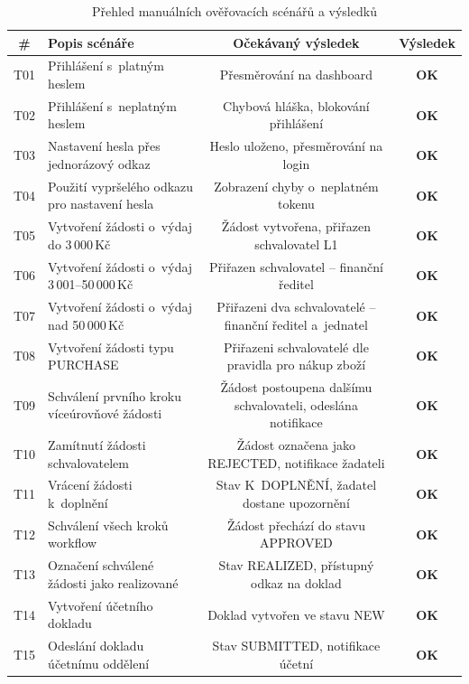 \begin{table}[H]
\centering
\caption{Přehled manuálních ověřovacích scénářů a výsledků}
\label{tab:testy}
\renewcommand{\arraystretch}{1.3}
\begin{tabularx}{\textwidth}{|c|X|c|c|}
\hline
\textbf{\#} & \textbf{Popis scénáře} & \textbf{Očekávaný výsledek} & \textbf{Výsledek} \\
\hline
T01 & Přihlášení s~platným heslem & Přesměrování na dashboard & \textbf{OK} \\
\hline
T02 & Přihlášení s~neplatným heslem & Chybová hláška, blokování přihlášení & \textbf{OK} \\
\hline
T03 & Nastavení hesla přes jednorázový odkaz & Heslo uloženo, přesměrování na login & \textbf{OK} \\
\hline
T04 & Použití vypršelého odkazu pro nastavení hesla & Zobrazení chyby o~neplatném tokenu & \textbf{OK} \\
\hline
T05 & Vytvoření žádosti o~výdaj do 3\,000\,Kč & Žádost vytvořena, přiřazen schvalovatel L1 & \textbf{OK} \\
\hline
T06 & Vytvoření žádosti o~výdaj 3\,001--50\,000\,Kč & Přiřazen schvalovatel -- finanční ředitel & \textbf{OK} \\
\hline
T07 & Vytvoření žádosti o~výdaj nad 50\,000\,Kč & Přiřazeni dva schvalovatelé -- finanční ředitel a~jednatel & \textbf{OK} \\
\hline
T08 & Vytvoření žádosti typu PURCHASE & Přiřazeni schvalovatelé dle pravidla pro nákup zboží & \textbf{OK} \\
\hline
T09 & Schválení prvního kroku víceúrovňové žádosti & Žádost postoupena dalšímu schvalovateli, odeslána notifikace & \textbf{OK} \\
\hline
T10 & Zamítnutí žádosti schvalovatelem & Žádost označena jako REJECTED, notifikace žadateli & \textbf{OK} \\
\hline
T11 & Vrácení žádosti k~doplnění & Stav K~DOPLNĚNÍ, žadatel dostane upozornění & \textbf{OK} \\
\hline
T12 & Schválení všech kroků workflow & Žádost přechází do stavu APPROVED & \textbf{OK} \\
\hline
T13 & Označení schválené žádosti jako realizované & Stav REALIZED, přístupný odkaz na doklad & \textbf{OK} \\
\hline
T14 & Vytvoření účetního dokladu & Doklad vytvořen ve stavu NEW & \textbf{OK} \\
\hline
T15 & Odeslání dokladu účetnímu oddělení & Stav SUBMITTED, notifikace účetní & \textbf{OK} \\

\end{tabularx}
\end{table}
